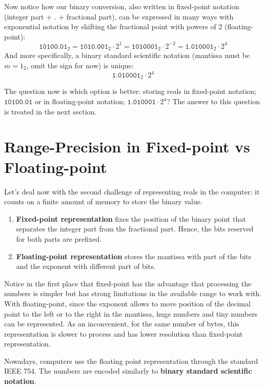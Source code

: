 Now notice how our binary conversion, also written in fixed-point notation (integer part + . + fractional part), can be expressed in many ways with exponential notation by shifting the fractional point with powers of 2 (floating-point):
$$
\texttt{10100.01}_{2} = \texttt{1010.001}_{2}\cdot2^1  = \texttt{1010001}_{2}\cdot2^{-2} = \texttt{1.010001}_{2}\cdot2^4
$$
And more specifically, a binary standard scientific notation (mantissa must be $m = 1_2$, omit the sign for now) is unique:
$$
\texttt{1.010001}_{2}\cdot2^4
$$

The question now is which option is better: storing reals in fixed-point notation; $\texttt{10100.01}$ or in floating-point notation; $\texttt{1.010001}\cdot2^4$?
The answer to this question is treated in the next section. 

    
    
    \section{Range-Precision in Fixed-point vs Floating-point}

Let's deal now with the second challenge of representing reals in the computer: 
it counts on a finite amount of memory to store the binary value.

\begin{enumerate}
    \item \textbf{Fixed-point representation} fixes the position of the binary point that separates 
    the integer part from the fractional part. Hence, the bits reserved for both parts are prefixed. 
    
    \item \textbf{Floating-point representation} stores the mantissa with part of the bits and 
    the exponent with different part of bits.
\end{enumerate}

Notice in the first place that fixed-point has the advantage that processing the numbers is simpler
but has strong limitations in the available range to work with. 
With floating-point, since the exponent allows to move position of the decimal point 
to the left or to the right in the mantissa, huge numbers and tiny numbers can be represented.
As an inconvenient, for the same number of bytes, 
this representation is slower to process and has lower resolution than fixed-point representation.

Nowadays, computers use the floating point representation through the standard IEEE 754.
The numbers are encoded similarly to \textbf{binary standard scientific notation}. 
 

